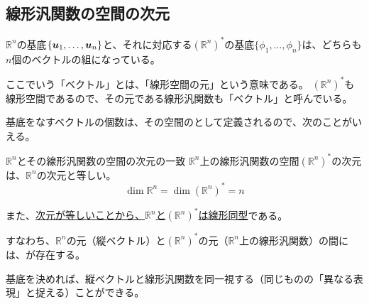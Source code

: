 \documentclass[../../../topic_linear-algebra]{subfiles}
\begin{document}
\subsection{線形汎関数の空間の次元}

$\mathbb{R}^n$の基底$\{ \vb*{u}_1, \ldots, \vb*{u}_n \}$と、それに対応する$(\mathbb{R}^n)^*$の基底$\{ \phi_1, \ldots, \phi_n \}$は、どちらも$n$個のベクトルの組になっている。

\begin{supplnote}
  ここでいう「ベクトル」とは、「線形空間の元」という意味である。
  $(\mathbb{R}^n)^*$も線形空間であるので、その元である線形汎関数も「ベクトル」と呼んでいる。
\end{supplnote}

基底をなすベクトルの個数は、その空間のとして定義されるので、次のことがいえる。

\begin{theorem*}{$\mathbb{R}^n$とその線形汎関数の空間の次元の一致}
  $\mathbb{R}^n$上の線形汎関数の空間$(\mathbb{R}^n)^*$の次元は、$\mathbb{R}^n$の次元と等しい。
  \begin{equation*}
    \dim \mathbb{R}^n = \dim (\mathbb{R}^n)^* = n
  \end{equation*}
\end{theorem*}

また、\hyperref[thm:abstract-linear-pigeonhole]{次元が等しいことから、$\mathbb{R}^n$と$(\mathbb{R}^n)^*$は線形同型}である。

すなわち、$\mathbb{R}^n$の元（縦ベクトル）と$(\mathbb{R}^n)^*$の元（$\mathbb{R}^n$上の線形汎関数）の間には、が存在する。

\br

基底を決めれば、縦ベクトルと線形汎関数を同一視する（同じものの「異なる表現」と捉える）ことができる。
\end{document}
